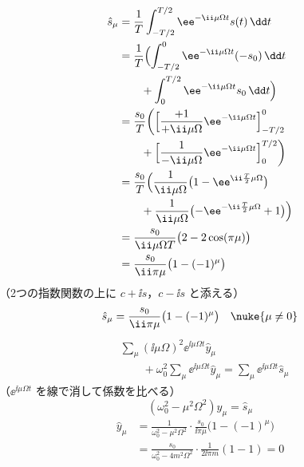 \begin{align*}
  \hat{s}_{\mu}&=\frac{1}{T}\int_{-T/2}^{T/2}\ee^{-\ii\mu\Omega t}s(t)\,\dd t\\
  &=\frac{1}{T}\Bigl(\int_{-T/2}^{0}\ee^{-\ii\mu\Omega t}(-s_0)\,\dd t\\
  &\qquad+\int_{0}^{T/2}\ee^{-\ii\mu\Omega t}s_0\,\dd t\Bigr)\\
  &=\frac{s_0}{T}\biggl(\Bigl[\frac{+1}{+\ii\mu\Omega}\ee^{-\ii\mu\Omega t}\Bigr]_{-T/2}^{0}\\
  &\qquad+\Bigl[\frac{1}{-\ii\mu\Omega}\ee^{-\ii\mu\Omega t}\Bigr]_{0}^{T/2}\biggr)\\
  &=\frac{s_0}{T}\Bigl(\frac{1}{\ii\mu\Omega}\bigl(1-\ee^{\ii\frac{T}{2}\mu\Omega}\bigr)\\
  &\qquad+\frac{1}{\ii\mu\Omega}\bigl(-\ee^{-\ii\frac{T}{2}\mu\Omega}+1\bigr)\Bigr)\\
  &=\frac{s_0}{\ii\mu\Omega T}\bigl(2-2\cos(\pi\mu)\bigr)\\
  &=\frac{s_0}{\ii\pi\mu}\bigl(1-(-1)^{\mu}\bigr)
\end{align*}
（2つの指数関数の上に $c+\ii s$，$c-\ii s$ と添える）
\[ \hat{s}_{\mu}=\frac{s_0}{\ii\pi\mu}\bigl(1-(-1)^{\mu}\bigr)\quad\nuke{\mu\neq0} \]
\begin{align*}
  &\sum_{\mu}(\ii\mu\Omega)^{2}\ee^{\ii\mu\Omega t}\hat{y}_{\mu}\\
  &\qquad+\omega_0^{2}\sum_{\mu}\ee^{\ii\mu\Omega t}\hat{y}_{\mu}=\sum_{\mu}\ee^{\ii\mu\Omega t}\hat{s}_{\mu}
\end{align*}
（$\ee^{\ii\mu\Omega t}$ を線で消して係数を比べる）
\[ (\omega_0^{2}-\mu^{2}\Omega^{2})\hat{y}_{\mu}=\hat{s}_{\mu} \]
\begin{align*}
  \hat{y}_{\mu}&=\frac{1}{\omega_0^{2}-\mu^{2}\Omega^{2}}\cdot\frac{s_0}{\ii\pi\mu}\bigl(1-(-1)^{\mu}\bigr)\\
  &=\frac{s_0}{\omega_0^{2}-4m^{2}\Omega^{2}}\cdot\frac{1}{2\ii\pi m}(1-1)=0
\end{align*}
